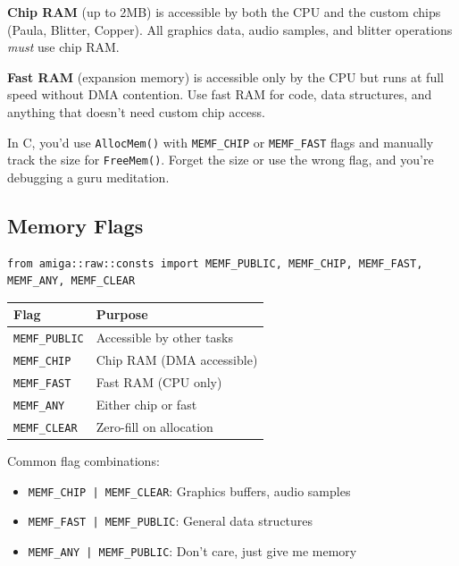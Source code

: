 \textbf{Chip RAM} (up to 2MB) is accessible by both the CPU and the custom chips (Paula, Blitter, Copper). All graphics data, audio samples, and blitter operations \emph{must} use chip RAM.

\textbf{Fast RAM} (expansion memory) is accessible only by the CPU but runs at full speed without DMA contention. Use fast RAM for code, data structures, and anything that doesn't need custom chip access.

\begin{comingfromc}
In C, you'd use \texttt{AllocMem()} with \texttt{MEMF\_CHIP} or \texttt{MEMF\_FAST} flags and manually track the size for \texttt{FreeMem()}. Forget the size or use the wrong flag, and you're debugging a guru meditation.
\end{comingfromc}

\subsection{Memory Flags}

\begin{lstlisting}
from amiga::raw::consts import MEMF_PUBLIC, MEMF_CHIP, MEMF_FAST, MEMF_ANY, MEMF_CLEAR
\end{lstlisting}

\begin{table}[h]
\centering
\begin{tabular}{ll}
\textbf{Flag} & \textbf{Purpose} \\
\hline
\texttt{MEMF\_PUBLIC} & Accessible by other tasks \\
\texttt{MEMF\_CHIP} & Chip RAM (DMA accessible) \\
\texttt{MEMF\_FAST} & Fast RAM (CPU only) \\
\texttt{MEMF\_ANY} & Either chip or fast \\
\texttt{MEMF\_CLEAR} & Zero-fill on allocation \\
\end{tabular}
\end{table}

Common flag combinations:
\begin{itemize}
    \item \texttt{MEMF\_CHIP | MEMF\_CLEAR}: Graphics buffers, audio samples
    \item \texttt{MEMF\_FAST | MEMF\_PUBLIC}: General data structures
    \item \texttt{MEMF\_ANY | MEMF\_PUBLIC}: Don't care, just give me memory
\end{itemize}

